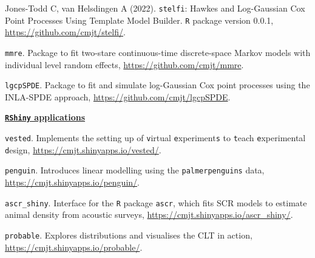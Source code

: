 \documentclass[10pt,a4paper]{moderncv}
\begin{document}
Jones-Todd C, van Helsdingen A (2022). \texttt{stelfi}: Hawkes and Log-Gaussian Cox Point Processes Using Template Model Builder. \texttt{R} package version 0.0.1, \url{https://github.com/cmjt/stelfi/}.\\

\vspace{-3pt}

\texttt{mmre}. Package to fit two-stare continuous-time discrete-space Markov models with individual level random effects, \url{https://github.com/cmjt/mmre}.\\

\vspace{-3pt}

\texttt{lgcpSPDE}. Package to fit and simulate log-Gaussian Cox point processes using the INLA-SPDE approach, \url{https://github.com/cmjt/lgcpSPDE}.\\

\vspace{2pt}

\underline{\textbf{\texttt{RShiny} applications}}\\
\vspace{-3pt}

\texttt{vested}. Implements the setting up of \texttt{v}irtual \texttt{e}xperiment\texttt{s} to \texttt{t}each \texttt{e}xperimental \texttt{d}esign, \url{https://cmjt.shinyapps.io/vested/}.\\

\vspace{-3pt}

\texttt{penguin}. Introduces linear modelling using the \texttt{palmerpenguins} data, \url{https://cmjt.shinyapps.io/penguin/}.\\

\vspace{-3pt}

\texttt{ascr\_shiny}. Interface for the \texttt{R} package \texttt{ascr}, which fits SCR models to estimate animal density from acoustic surveys, \url{https://cmjt.shinyapps.io/ascr_shiny/}.\\

\vspace{-3pt}

\texttt{probable}. Explores distributions and visualises the CLT in action, \url{https://cmjt.shinyapps.io/probable/}.\\




\end{document}
